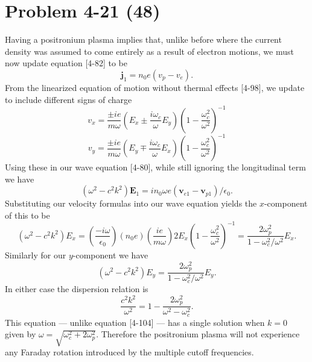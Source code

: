 \section*{Problem 4-21 (48)}
\label{sec:4-21}
Having a positronium plasma implies that, unlike before where the current density was assumed to come entirely as a result of electron motions, we must now update equation [4-82] to be
\begin{equation*}
	\bm{j}_1 = n_0e\left(v_p - v_e\right).
\end{equation*}
From the linearized equation of motion without thermal effects [4-98], we update to include different signs of charge
\begin{equation*}
	v_x = \dfrac{\pm ie}{m\omega}\left(E_x \pm \dfrac{i\omega_c}{\omega}E_y \right)\left(1 - \dfrac{\omega_c^2}{\omega^2}\right)^{-1} 
\end{equation*} 
\begin{equation*}
	v_y = \dfrac{\pm ie}{m\omega}\left(E_y \mp \dfrac{i\omega_c}{\omega}E_x \right)\left(1 - \dfrac{\omega_c^2}{\omega^2}\right)^{-1} 
\end{equation*}
Using these in our wave equation [4-80], while still ignoring the longitudinal term we have
\begin{equation*}
	\left(\omega^2 - c^2k^2 \right)\bm{E}_1 = in_0\omega e(\bm{v}_{e1} - \bm{v}_{p1})/\epsilon_0.
\end{equation*}
Substituting our velocity formulas into our wave equation yields the \(x\)-component of this to be
\begin{equation*}
	\left(\omega^2 - c^2k^2 \right)E_x = \left(\dfrac{-i\omega}{\epsilon_0} \right)(n_0 e)\left(\dfrac{ie}{m\omega} \right)2E_x\left(1 - \dfrac{\omega_c^2}{\omega^2}\right)^{-1} = \dfrac{2\omega_p^2}{1 - \omega_c^2/\omega^2}E_x.
\end{equation*}
Similarly for our \(y\)-component we have
\begin{equation*}
\left(\omega^2 - c^2k^2 \right)E_y = \dfrac{2\omega_p^2}{1 - \omega_c^2/\omega^2}E_y.
\end{equation*}
In either case the dispersion relation is
\begin{equation*}
	\dfrac{c^2k^2}{\omega^2} = 1 - \dfrac{2\omega_p^2}{\omega^2 - \omega_c^2}.
\end{equation*}
This equation --- unlike equation [4-104] --- has a single solution when \(k=0\) given by \(\omega = \sqrt{\omega_c^2 + 2\omega_p^2} \). Therefore the positronium plasma will not experience any Faraday rotation introduced by the multiple cutoff frequencies.

